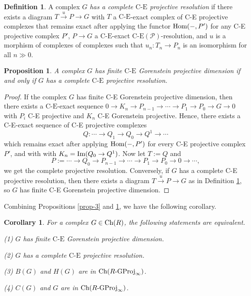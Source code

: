 \documentclass[reqno,12pt]{amsart}
\numberwithin{equation}{section}
\def\Im{\mbox{\rm Im}} \def\id{\mbox{\rm id}} \def\wid{\mbox{\rm w{\text -}id}} \def\FPid{\mbox{\rm FP{\text -}id}}
\def\Ch{\mbox{\rm Ch}}
\theoremstyle{plain}
\newtheorem{corollary}[theorem]{\bf Corollary}
\newtheorem{proposition}[theorem]{\bf Proposition}
\theoremstyle{definition}
\newtheorem{definition}[theorem]{\bf Definition}
\newcommand{\CE}{\mathrm{C}\text{-}\mathrm{E}}
\begin{document}
\begin{definition}\label{def-1}
    A complex $G$ {\it has a complete $\CE$ projective resolution} if there exists a diagram $T\stackrel{u}\to P\to G$ with $T$ a $\CE$-exact complex of C-E projective complexes that remains exact after applying the functor $\mbox{\rm Hom}(-,P')$ for any C-E projective complex $P'$, $P\to G$ a $\CE$-exact $\text{C-E}(\mathcal{P})$-resolution, and $u$ is a morphism of complexes of complexes such that $u_n:T_n\to P_n$ is an isomorphism for all $n\gg 0$.
\end{definition}

\begin{proposition}\label{prop-5}
    A complex $G$ has finite $\CE$ Gorenstein projective dimension if and only if $G$ has a complete $\CE$ projective resolution.
\end{proposition}
\begin{proof}
    If the complex $G$ has finite C-E Gorenstein projective dimension, then there exists a $\CE$-exact sequence $0\to K_n\to P_{n-1}\to \cdots\to P_1\to P_0\to G\to 0$ with $P_i$ C-E projective and $K_n$ C-E Gorenstein projective. Hence, there exists a C-E-exact sequence of C-E projective complexes
    $$Q:\cdots\to Q_{1}\to Q_{0}\to Q^{1}\to\cdots$$ which remains exact after applying $\mbox{\rm Hom}(-,P')$ for every C-E projective complex $P'$, and with
    with $K_n=\Im(Q_{0}\to Q^1)$. Now let $T:=Q$ and
    $$P:=\cdots\to Q_{0}\to P_{n-1}\to \cdots\to P_1\to P_0\to 0\to \cdots,$$
    we get the complete projective resolution. Conversely, if $G$ has a complete C-E projective resolution, then there exists a diagram $T\stackrel{u}\to P\to G$ as in Definition \ref{def-1}, so $G$ has finite C-E Gorenstein projective dimension.
\end{proof}
Combining Propositions \ref{prop-3} and \ref{prop-5}, we have the following corollary.
\begin{corollary}
    For a complex $G\in\Ch(R)$, the following statements are equivalent.

    {\rm (1)} $G$ has finite $\CE$ Gorenstein projective dimension.

    {\rm (2)} $G$ has a complete $\CE$ projective resolution.

    {\rm (3)} $B(G)$ and $H(G)$ are in $\Ch(R\text{-}{\rm GProj}_{\infty})$.

    {\rm (4)} $C(G)$ and $G$ are in $\Ch(R\text{-}{\rm GProj}_{\infty})$.
\end{corollary}
\end{document}
